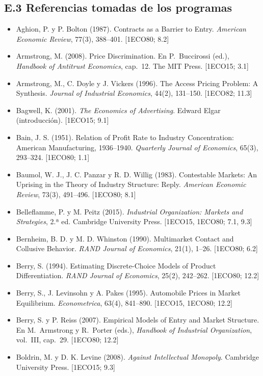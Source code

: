 \documentclass[11pt,a4paper]{article}
\begin{document}
\subsection*{E.3 Referencias tomadas de los programas}
{\small\sloppy
\begin{itemize}[leftmargin=1.4em,itemsep=1pt,label={}]
\item Aghion, P. y P. Bolton (1987). Contracts as a Barrier to Entry. \emph{American Economic Review}, 77(3), 388--401. [1ECO80; 8.2]
\item Armstrong, M. (2008). Price Discrimination. En P.~Buccirossi (ed.), \emph{Handbook of Antitrust Economics}, cap.~12. The MIT Press. [1ECO15; 3.1]
\item Armstrong, M., C. Doyle y J. Vickers (1996). The Access Pricing Problem: A Synthesis. \emph{Journal of Industrial Economics}, 44(2), 131--150. [1ECO82; 11.3]
\item Bagwell, K. (2001). \emph{The Economics of Advertising}. Edward Elgar (introducción). [1ECO15; 9.1]
\item Bain, J. S. (1951). Relation of Profit Rate to Industry Concentration: American Manufacturing, 1936--1940. \emph{Quarterly Journal of Economics}, 65(3), 293--324. [1ECO80; 1.1]
\item Baumol, W. J., J. C. Panzar y R. D. Willig (1983). Contestable Markets: An Uprising in the Theory of Industry Structure: Reply. \emph{American Economic Review}, 73(3), 491--496. [1ECO80; 8.1]
\item Belleflamme, P. y M. Peitz (2015). \emph{Industrial Organization: Markets and Strategies}, 2.ª ed. Cambridge University Press. [1ECO15, 1ECO80; 7.1, 9.3]
\item Bernheim, B. D. y M. D. Whinston (1990). Multimarket Contact and Collusive Behavior. \emph{RAND Journal of Economics}, 21(1), 1--26. [1ECO80; 6.2]
\item Berry, S. (1994). Estimating Discrete-Choice Models of Product Differentiation. \emph{RAND Journal of Economics}, 25(2), 242--262. [1ECO80; 12.2]
\item Berry, S., J. Levinsohn y A. Pakes (1995). Automobile Prices in Market Equilibrium. \emph{Econometrica}, 63(4), 841--890. [1ECO15, 1ECO80; 12.2]
\item Berry, S. y P. Reiss (2007). Empirical Models of Entry and Market Structure. En M.~Armstrong y R.~Porter (eds.), \emph{Handbook of Industrial Organization}, vol.~III, cap.~29. [1ECO80; 12.2]
\item Boldrin, M. y D. K. Levine (2008). \emph{Against Intellectual Monopoly}. Cambridge University Press. [1ECO15; 9.3]

\end{itemize}}
\end{document}
